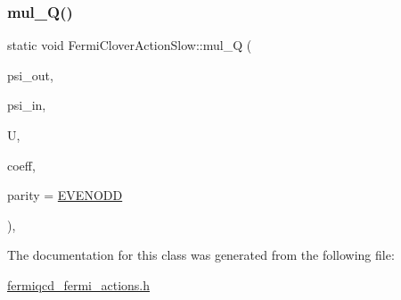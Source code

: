 \subsubsection{\texorpdfstring{mul\+\_\+\+Q()}{mul\_Q()}}
{\footnotesize\ttfamily static void Fermi\+Clover\+Action\+Slow\+::mul\+\_\+Q (\begin{DoxyParamCaption}\item[{\hyperlink{classfermi__field}{fermi\+\_\+field} \&}]{psi\+\_\+out,  }\item[{\hyperlink{classfermi__field}{fermi\+\_\+field} \&}]{psi\+\_\+in,  }\item[{\hyperlink{classgauge__field}{gauge\+\_\+field} \&}]{U,  }\item[{\hyperlink{classcoefficients}{coefficients} \&}]{coeff,  }\item[{int}]{parity = {\ttfamily \hyperlink{mdp__global__vars_8h_a4c9de81f2de5a74b588107b6c0afb9ee}{E\+V\+E\+N\+O\+DD}} }\end{DoxyParamCaption})\hspace{0.3cm}{\ttfamily [inline]}, {\ttfamily [static]}}



The documentation for this class was generated from the following file\+:\begin{DoxyCompactItemize}
\item 
\hyperlink{fermiqcd__fermi__actions_8h}{fermiqcd\+\_\+fermi\+\_\+actions.\+h}\end{DoxyCompactItemize}
